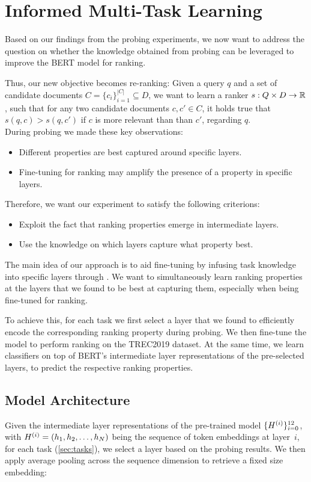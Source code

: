 \chapter{Informed Multi-Task Learning}
\label{chap:mtl}
Based on our findings from the probing experiments, we now want to address the question on whether the knowledge obtained from probing can be leveraged to improve the BERT model for ranking.

Thus, our new objective becomes re-ranking: Given a query $q$ and a set of candidate documents $C=\{c_i\}_{i=1}^{|C|} \subseteq D$, we want to learn a ranker $s: Q \times D \rightarrow \mathbb{R}$, such that for any two candidate documents $c, c' \in C$, it holds true that $s(q, c) > s(q, c')$ if $c$ is more relevant than than $c'$, regarding $q$.\\
During probing we made these key observations:

\begin{itemize}
    \item Different properties are best captured around specific layers.
    \item Fine-tuning for ranking may amplify the presence of a property in specific layers.
\end{itemize}
Therefore, we want our experiment to satisfy the following criterions:

\begin{itemize}
    \item Exploit the fact that ranking properties emerge in intermediate layers.
    \item Use the knowledge on which layers capture what property best.
\end{itemize}
The main idea of our approach is to aid fine-tuning by infusing task knowledge into specific layers through . We want to simultaneously learn ranking properties at the layers that we found to be best at capturing them, especially when being fine-tuned for ranking.

To achieve this, for each task we first select a layer that we found to efficiently encode the corresponding  ranking property during probing. We then fine-tune the  model to perform ranking on the TREC2019 dataset. At the same time, we learn classifiers on top of BERT's intermediate layer representations of the pre-selected layers, to predict the respective ranking properties.

\section{Model Architecture}
Given the intermediate layer representations of the pre-trained  model $\{H^{(i)}\}_{i=0}^{12}$, with $H^{(i)} = (h_1, h_2, \dots, h_{N})$ being the sequence of token embeddings at layer~$i$, for each task (\autoref{sec:tasks}), we select a layer based on the probing results. We then apply average pooling across the sequence dimension to retrieve a fixed size embedding:

